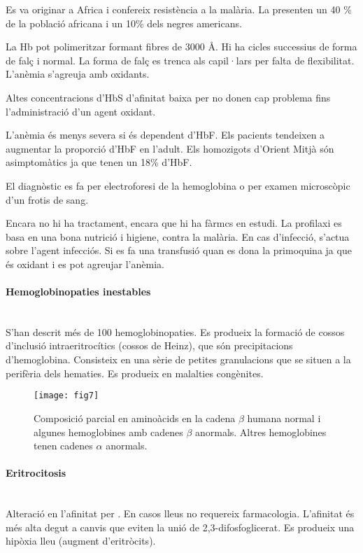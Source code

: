 \begin{itemize}
Es va originar a Africa i confereix resistència a la malària. La
presenten un 40 \% de la població africana i un 10\% dels negres
americans.

La Hb pot polimeritzar formant fibres de 3000 \AA{}. Hi ha cicles
successius de forma de falç i normal. La forma de falç es trenca als
capil·lars per falta de flexibilitat. L'anèmia s'agreuja amb oxidants.

Altes concentracions d'HbS d'afinitat baixa per  no donen cap
problema fins l'administració d'un agent oxidant.

L'anèmia és menys severa si és dependent d'HbF. Els pacients tendeixen
a augmentar la proporció d'HbF en l'adult. Els homozigots d'Orient
Mitjà són asimptomàtics ja que tenen un 18\% d'HbF.

El diagnòstic es fa per electroforesi de la hemoglobina o per examen
microscòpic d'un frotis de sang.

Encara no hi ha tractament, encara que hi ha fàrmcs en estudi. La
profilaxi es basa en una bona nutrició i higiene, contra la
malària. En cas d'infecció, s'actua sobre l'agent infecciós. Si es fa
una transfusió quan es dona la primoquina ja que és oxidant i es pot
agreujar l'anèmia.

\paragraph{Hemoglobinopaties inestables} \hfill \\
S'han descrit més de 100 hemoglobinopaties. Es produeix la formació de
cossos d'inclusió intraeritrocítics (cossos de Heinz), que són
precipitacions d'hemoglobina. Consisteix en una sèrie de petites
granulacions que se situen a la perifèria dels hematies. Es produeix
en malalties congènites.

\begin{figure}[H]
  \centering
  \texttt{[image: fig7]}
  \caption{Composició parcial en aminoàcids en la cadena $\beta$ humana
    normal i algunes hemoglobines amb cadenes $\beta$ anormals. Altres
    hemoglobines tenen cadenes $\alpha$ anormals.}
  \label{fig:fig7}
\end{figure}

\paragraph{Eritrocitosis} \hfill \\
Alteració en l'afinitat per . En casos lleus no requereix
farmacologia. L'afinitat és més alta degut a canvis que eviten la unió
de 2,3-difosfoglicerat. Es produeix una hipòxia lleu (augment
d'eritròcits).


\end{itemize}

